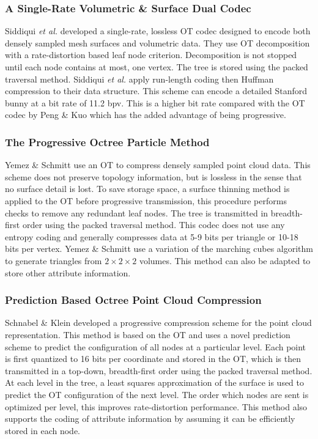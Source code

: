\subsubsection{A Single-Rate Volumetric \& Surface Dual Codec}

Siddiqui \textit{et al.} \cite{Siddiqui07Octree} developed a single-rate, lossless OT codec designed to encode both densely sampled mesh surfaces and volumetric data. They use OT decomposition with a rate-distortion based leaf node criterion. Decomposition is not stopped until each node contains at most, one vertex. The tree is stored using the packed traversal method. Siddiqui \textit{et al.} apply run-length coding then Huffman compression to their data structure. This scheme can encode a detailed Stanford bunny at a bit rate of 11.2 bpv. This is a higher bit rate compared with the OT codec by Peng \& Kuo \cite{Peng05Progressive, Peng05Geometry-Guided} which has the added advantage of being progressive.

\subsubsection{The Progressive Octree Particle Method}

Yemez \& Schmitt \cite{Yemez03Multilevel} use an OT to compress densely sampled point cloud data. This scheme does not preserve topology information, but is lossless in the sense that no surface detail is lost. To save storage space, a surface thinning method is applied to the OT before progressive transmission, this procedure performs checks to remove any redundant leaf nodes. The tree is transmitted in breadth-first order using the packed traversal method. This codec does not use any entropy coding and generally compresses data at 5-9 bits per triangle or 10-18 bits per vertex. Yemez \& Schmitt use a variation of the marching cubes algorithm to generate triangles from $2\times 2\times 2$ volumes. This method can also be adapted to store other attribute information.

\subsubsection{Prediction Based Octree Point Cloud Compression}

Schnabel \& Klein \cite{Schnabel06Otree-based} developed a progressive compression scheme for the point cloud representation. This method is based on the OT and uses a novel prediction scheme to predict the configuration of all nodes at a particular level. Each point is first quantized to 16 bits per coordinate and stored in the OT, which is then transmitted in a top-down, breadth-first order using the packed traversal method. At each level in the tree, a least squares approximation of the surface is used to predict the OT configuration of the next level. The order which nodes are sent is optimized per level, this improves rate-distortion performance. This method also supports the coding of attribute information by assuming it can be efficiently stored in each node.

